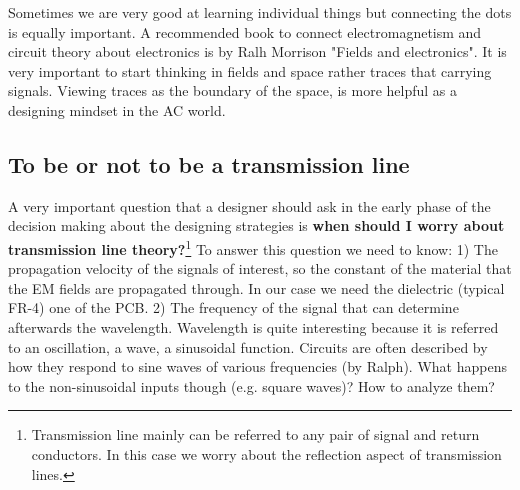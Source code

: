 \documentclass[final]{cubedoc}
\begin{document}
	
	
	Sometimes we are very good at learning individual things but connecting the dots is equally important. A recommended book to connect electromagnetism and circuit theory about electronics is by Ralh Morrison "Fields and electronics". It is very important to start thinking in fields and space rather traces that carrying signals. Viewing traces as the boundary of the space, is more helpful as a designing mindset in the AC world.
	
	
	\subsection{To be or not to be a transmission line}
	
	A very important question that a designer should ask in the early phase of the decision making about the designing strategies is \textbf{when should I worry about transmission line theory?}\footnote{Transmission line mainly can be referred to any pair of signal and return conductors. In this case we worry about the reflection aspect of transmission lines.} To answer this question we need to know: 1) The propagation velocity of the signals of interest, so the constant of the material that the EM fields are propagated through. In our case we need the dielectric (typical FR-4) one of the PCB. 2) The frequency of the signal that can determine afterwards the wavelength. Wavelength is quite interesting because it is referred to an oscillation, a wave, a sinusoidal function. Circuits are often described by how they respond to sine waves of various frequencies (by Ralph). What happens to the non-sinusoidal inputs though (e.g. square waves)? How to analyze them? 
	
\end{document}
